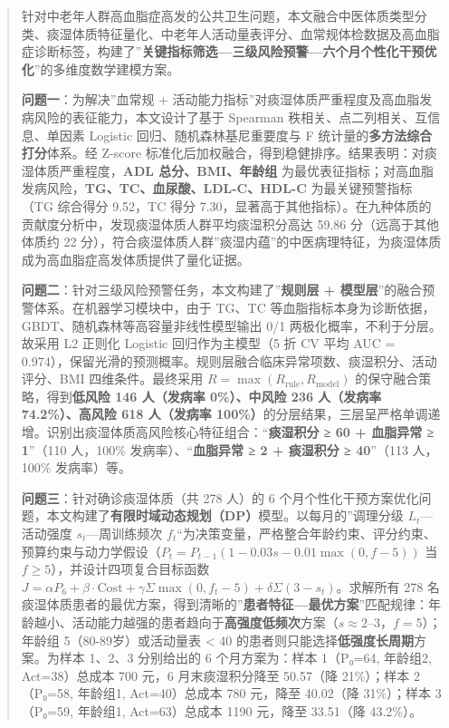 \documentclass{MathorCupmodeling}
\begin{document}
\begin{abstract}
针对中老年人群高血脂症高发的公共卫生问题，本文融合中医体质类型分类、痰湿体质特征量化、中老年人活动量表评分、血常规体检数据及高血脂症诊断标签，构建了''\textbf{关键指标筛选---三级风险预警---六个月个性化干预优化}''的多维度数学建模方案。

\textbf{问题一}：为解决''血常规 + 活动能力指标''对痰湿体质严重程度及高血脂发病风险的表征能力，本文设计了基于 Spearman 秩相关、点二列相关、互信息、单因素 Logistic 回归、随机森林基尼重要度与 F 统计量的\textbf{多方法综合打分}体系。经 Z-score 标准化后加权融合，得到稳健排序。结果表明：对痰湿体质严重程度，\textbf{ADL 总分、BMI、年龄组} 为最优表征指标；对高血脂发病风险，\textbf{TG、TC、血尿酸、LDL-C、HDL-C} 为最关键预警指标（TG 综合得分 9.52，TC 得分 7.30，显著高于其他指标）。在九种体质的贡献度分析中，发现痰湿体质人群平均痰湿积分高达 59.86 分（远高于其他体质约 22 分），符合痰湿体质人群''痰湿内蕴''的中医病理特征，为痰湿体质成为高血脂症高发体质提供了量化证据。

\textbf{问题二}：针对三级风险预警任务，本文构建了''\textbf{规则层 + 模型层}''的融合预警体系。在机器学习模块中，由于 TG、TC 等血脂指标本身为诊断依据，GBDT、随机森林等高容量非线性模型输出 0/1 两极化概率，不利于分层。故采用 L2 正则化 Logistic 回归作为主模型（5 折 CV 平均 AUC = 0.974），保留光滑的预测概率。规则层融合临床异常项数、痰湿积分、活动评分、BMI 四维条件。最终采用 \(R = \max(R_{\text{rule}}, R_{\text{model}})\) 的保守融合策略，得到\textbf{低风险 146 人（发病率 0\%）、中风险 236 人（发病率 74.2\%）、高风险 618 人（发病率 100\%）}的分层结果，三层呈严格单调递增。识别出痰湿体质高风险核心特征组合：``\textbf{痰湿积分 ≥ 60 + 血脂异常 ≥ 1}''（110 人，100\% 发病率）、``\textbf{血脂异常 ≥ 2 + 痰湿积分 ≥ 40}''（113 人，100\% 发病率）等。

\textbf{问题三}：针对确诊痰湿体质（共 278 人）的 6 个月个性化干预方案优化问题，本文构建了\textbf{有限时域动态规划（DP）}模型。以每月的''调理分级 \(L_t\)---活动强度 \(s_t\)---周训练频次 \(f_t\)``为决策变量，严格整合年龄约束、评分约束、预算约束与动力学假设（\(P_t = P_{t-1}(1 - 0.03s - 0.01\max(0, f-5))\) 当 \(f \ge 5\)），并设计四项复合目标函数 \(J = \alpha P_6 + \beta \cdot \text{Cost} + \gamma \Sigma\max(0, f_t-5) + \delta \Sigma(3-s_t)\)。求解所有 278 名痰湿体质患者的最优方案，得到清晰的''\textbf{患者特征---最优方案}''匹配规律：年龄越小、活动能力越强的患者趋向于\textbf{高强度低频次}方案（\(s \approx 2\text{–}3\)，\(f = 5\)）；年龄组 5（80-89岁）或活动量表 \textless{} 40 的患者则只能选择\textbf{低强度长周期}方案。为样本 1、2、3 分别给出的 6 个月方案为：样本 1（P₀=64, 年龄组2, Act=38）总成本 700 元，6 月末痰湿积分降至 50.57（降 21\%）；样本 2（P₀=58, 年龄组1, Act=40）总成本 780 元，降至 40.02（降 31\%）；样本 3（P₀=59, 年龄组1, Act=63）总成本 1190 元，降至 33.51（降 43.2\%）。
\end{abstract}
\end{document}
